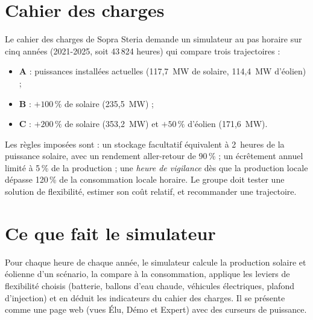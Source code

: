 \documentclass[11pt, a4paper]{report}
\newcommand{\pct}{\,\%}
\begin{document}
\section*{Cahier des charges}

Le cahier des charges de Sopra Steria demande un simulateur au pas horaire sur cinq années (2021-2025, soit 43\,824 heures) qui compare trois trajectoires :
\begin{itemize}
  \item \textbf{A} : puissances installées actuelles (117,7~MW de solaire, 114,4~MW d'éolien) ;
  \item \textbf{B} : $+100\pct$ de solaire (235,5~MW) ;
  \item \textbf{C} : $+200\pct$ de solaire (353,2~MW) et $+50\pct$ d'éolien (171,6~MW).
\end{itemize}
Les règles imposées sont : un stockage facultatif équivalent à 2~heures de la puissance solaire, avec un rendement aller-retour de 90\pct{} ; un écrêtement annuel limité à 5\pct{} de la production ; une \emph{heure de vigilance} dès que la production locale dépasse 120\pct{} de la consommation locale horaire. Le groupe doit tester une solution de flexibilité, estimer son coût relatif, et recommander une trajectoire.

\section*{Ce que fait le simulateur}

Pour chaque heure de chaque année, le simulateur calcule la production solaire et éolienne d'un scénario, la compare à la consommation, applique les leviers de flexibilité choisis (batterie, ballons d'eau chaude, véhicules électriques, plafond d'injection) et en déduit les indicateurs du cahier des charges. Il se présente comme une page web (vues Élu, Démo et Expert) avec des curseurs de puissance.
\end{document}
